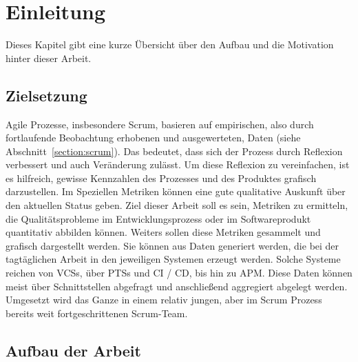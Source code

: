 \chapter{Einleitung}

Dieses Kapitel gibt eine kurze Übersicht über den Aufbau und die Motivation hinter dieser Arbeit.

\section{Zielsetzung}

Agile Prozesse, insbesondere Scrum, basieren auf empirischen, also durch fortlaufende Beobachtung erhobenen und ausgewerteten, Daten (siehe Abschnitt~\ref{section:scrum}).
Das bedeutet, dass sich der Prozess durch Reflexion verbessert und auch Veränderung zulässt.
Um diese Reflexion zu vereinfachen, ist es hilfreich, gewisse Kennzahlen des Prozesses und des Produktes grafisch darzustellen.
Im Speziellen Metriken können eine gute qualitative Auskunft über den aktuellen Status geben.
Ziel dieser Arbeit soll es sein, Metriken zu ermitteln, die Qualitätsprobleme im Entwicklungsprozess oder im Softwareprodukt quantitativ abbilden können.
Weiters sollen diese Metriken gesammelt und grafisch dargestellt werden.
Sie können aus Daten generiert werden, die bei der tagtäglichen Arbeit in den jeweiligen Systemen erzeugt werden.
Solche Systeme reichen von \acfp{VCS}, über \acfp{PTS} und \acf{CI} / \acf{CD}, bis hin zu \acf{APM}.
Diese Daten können meist über Schnittstellen abgefragt und anschließend aggregiert abgelegt werden.
Umgesetzt wird das Ganze in einem relativ jungen, aber im Scrum Prozess bereits weit fortgeschrittenen Scrum-Team.

\clearpage
\section{Aufbau der Arbeit}

